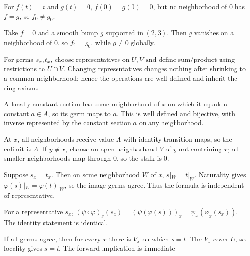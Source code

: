 \begin{solution}
For $f(t)=t$ and $g(t)=0$, $f(0)=g(0)=0$, but no neighborhood of $0$ has $f=g$, so $f_0\neq g_0$.
\end{solution}

\begin{solution}
Take $f=0$ and a smooth bump $g$ supported in $(2,3)$. Then $g$ vanishes on a neighborhood of $0$, so $f_0=g_0$, while $g\neq0$ globally.
\end{solution}

\begin{solution}
For germs $s_x,t_x$, choose representatives on $U,V$ and define sum/product using restrictions to $U\cap V$. Changing representatives changes nothing after shrinking to a common neighborhood; hence the operations are well defined and inherit the ring axioms.
\end{solution}

\begin{solution}
A locally constant section has some neighborhood of $x$ on which it equals a constant $a\in A$, so its germ maps to $a$. This is well defined and bijective, with inverse represented by the constant section $a$ on any neighborhood.
\end{solution}

\begin{solution}
At $x$, all neighborhoods receive value $A$ with identity transition maps, so the colimit is $A$. If $y\neq x$, choose an open neighborhood $V$ of $y$ not containing $x$; all smaller neighborhoods map through $0$, so the stalk is $0$.
\end{solution}

\begin{solution}
Suppose $s_x=t_x$. Then on some neighborhood $W$ of $x$, $s|_W=t|_W$. Naturality gives $\varphi(s)|_W=\varphi(t)|_W$, so the image germs agree. Thus the formula is independent of representative.
\end{solution}

\begin{solution}
For a representative $s_x$, $(\psi\circ\varphi)_x(s_x)=(\psi(\varphi(s)))_x=\psi_x(\varphi_x(s_x))$. The identity statement is identical.
\end{solution}

\begin{solution}
If all germs agree, then for every $x$ there is $V_x$ on which $s=t$. The $V_x$ cover $U$, so locality gives $s=t$. The forward implication is immediate.
\end{solution}

